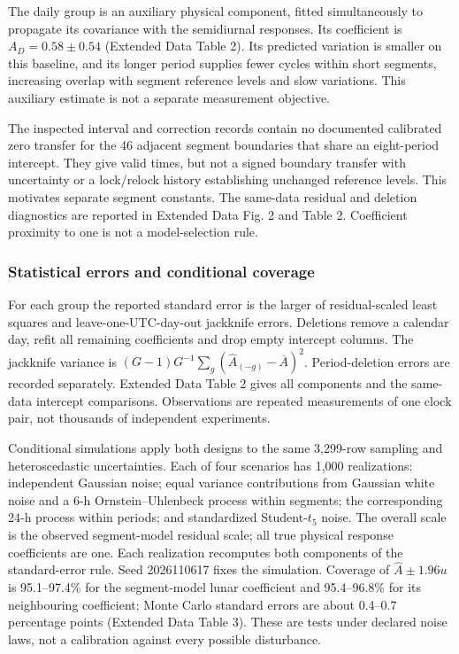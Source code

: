 \documentclass[
  12pt,
  a4paper,
]{article}
\begin{document}
The daily group is an auxiliary physical component, fitted
simultaneously to propagate its covariance with the semidiurnal
responses. Its coefficient is \(A_D=0.58\pm0.54\) (Extended Data Table
2). Its predicted variation is smaller on this baseline, and its longer
period supplies fewer cycles within short segments, increasing overlap
with segment reference levels and slow variations. This auxiliary
estimate is not a separate measurement objective.

The inspected interval and correction records contain no documented
calibrated zero transfer for the 46 adjacent segment boundaries that
share an eight-period intercept. They give valid times, but not a signed
boundary transfer with uncertainty or a lock/relock history establishing
unchanged reference levels. This motivates separate segment constants.
The same-data residual and deletion diagnostics are reported in Extended
Data Fig. 2 and Table 2. Coefficient proximity to one is not a
model-selection rule.

\hypertarget{statistical-errors-and-conditional-coverage}{%
\subsubsection{Statistical errors and conditional
coverage}\label{statistical-errors-and-conditional-coverage}}

For each group the reported standard error is the larger of
residual-scaled least squares and leave-one-UTC-day-out jackknife
errors. Deletions remove a calendar day, refit all remaining
coefficients and drop empty intercept columns. The jackknife variance is
\((G-1)G^{-1}\sum_g(\hat A_{(-g)}-\overline A)^2\). Period-deletion
errors are recorded separately. Extended Data Table 2 gives all
components and the same-data intercept comparisons. Observations are
repeated measurements of one clock pair, not thousands of independent
experiments.

Conditional simulations apply both designs to the same 3,299-row
sampling and heteroscedastic uncertainties. Each of four scenarios has
1,000 realizations: independent Gaussian noise; equal variance
contributions from Gaussian white noise and a 6-h Ornstein--Uhlenbeck
process within segments; the corresponding 24-h process within periods;
and standardized Student-\(t_5\) noise. The overall scale is the
observed segment-model residual scale; all true physical response
coefficients are one. Each realization recomputes both components of the
standard-error rule. Seed 2026110617 fixes the simulation. Coverage of
\(\hat A\pm1.96u\) is 95.1--97.4\% for the segment-model lunar
coefficient and 95.4--96.8\% for its neighbouring coefficient; Monte
Carlo standard errors are about 0.4--0.7 percentage points (Extended
Data Table 3). These are tests under declared noise laws, not a
calibration against every possible disturbance.
\end{document}
